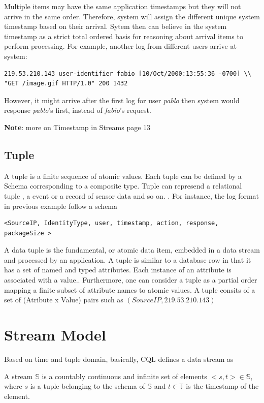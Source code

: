 Multiple items may have the same application timestamps but they will not arrive in the same order. Therefore, system will assign the different unique system timestamp based on their arrival. Sytem then can believe in the system timestamp as a strict total ordered basis for reasoning about arrival items to perform processing. For example, another log from different users arrive at system:
\begin{verbatim}
219.53.210.143 user-identifier fabio [10/Oct/2000:13:55:36 -0700] \\
"GET /image.gif HTTP/1.0" 200 1432
\end{verbatim}
However, it might arrive after the first log for user \textit{pablo} then system would response \textit{pablo}'s first, instead of \textit{fabio}'s request.

\textbf{Note}: more on Timestamp in Streams \citep{Babcock:2002} page 13

\subsection*{Tuple}
A tuple is a finite sequence of atomic values. Each tuple can be defined by a Schema corresponding to a composite type. Tuple can represend a relational tuple , a event or a record of sensor data and so on. \citep{Arasu:2006:CCQ}. For instance, the log format in previous example follow a schema
\begin{verbatim}
<SourceIP, IdentityType, user, timestamp, action, response, packageSize >
\end{verbatim}

A data tuple is the fundamental, or atomic data item, embedded in a data stream and processed by an application. A tuple is similar to a database row in that it has a set of named and typed attributes. Each instance of an attribute is associated with a value.\citep{Henrique:2014}. Furthermore, one can consider a tuple as a partial order mapping a finite subset of attribute names to atomic values\citep{Petit:2012}. A tuple consits of a set of (Atribute x Value) pairs such as $(SourceIP, 219.53.210.143)$



\section{Stream Model}
Based on time and tuple domain, basically, CQL \citep{Arasu:2006:CCQ} defines a data stream as
\begin{defi}
	A stream $\mathbb{S}$ is a countably continuous and infinite set of elements $<s,t> \in \mathbb{S}$, where $s$ is a tuple belonging to the schema of $\mathbb{S}$ and $t \in \mathbb{T}$ is the timestamp of the element. 
\end{defi}

